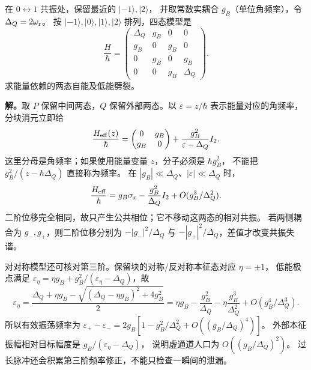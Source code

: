 \begin{exbox}[两侧虚通道的共同位移与差分位移]
在 $0\leftrightarrow1$ 共振处，保留最近的 $|-1\rangle,|2\rangle$，
并取常数实耦合 $g_B$（单位角频率），令 $\Delta_Q=2\omega_{\rm r}$。
按 $|-1\rangle,|0\rangle,|1\rangle,|2\rangle$ 排列，四态模型是
\[
\frac H\hbar=\begin{pmatrix}
\Delta_Q&g_B&0&0\\g_B&0&g_B&0\\
0&g_B&0&g_B\\0&0&g_B&\Delta_Q
\end{pmatrix}.
\]
求能量依赖的两态自能及低能劈裂。

\textbf{解。}取 $P$ 保留中间两态，$Q$ 保留外部两态。以 $\varepsilon=z/\hbar$ 表示能量对应的角频率，
分块消元立即给
\begin{equation}
\frac{H_{\rm eff}(z)}{\hbar}
=\begin{pmatrix}0&g_B\\g_B&0\end{pmatrix}
+\frac{g_B^2}{\varepsilon-\Delta_Q}I_2.
\label{eq:feqo-four-state-schur-effective}
\end{equation}
这里分母是角频率；如果使用能量变量 $z$，分子必须是 $\hbar g_B^2$，
不能把 $g_B^2/(z-\hbar\Delta_Q)$ 直接称为频率。
在 $|g_B|\ll\Delta_Q$、$|\varepsilon|\ll\Delta_Q$ 时，
\[
\frac{H_{\rm eff}}\hbar
=g_B\sigma_x-\frac{g_B^2}{\Delta_Q}I_2
+O(g_B^3/\Delta_Q^2).
\]
二阶位移完全相同，故只产生公共相位；它不移动这两态的相对共振。
若两侧耦合为 $g_-,g_+$，则二阶位移分别为
$-|g_-|^2/\Delta_Q$ 与 $-|g_+|^2/\Delta_Q$，差值才改变共振失谐。

对对称模型还可核对第三阶。保留块的对称/反对称本征态对应 $\eta=\pm1$，
低能极点满足 $\varepsilon_\eta=\eta g_B+g_B^2/(\varepsilon_\eta-\Delta_Q)$，故
\[
\varepsilon_\eta=\frac{\Delta_Q+\eta g_B-
\sqrt{(\Delta_Q-\eta g_B)^2+4g_B^2}}2
=\eta g_B-\frac{g_B^2}{\Delta_Q}
-\eta\frac{g_B^3}{\Delta_Q^2}+O(g_B^4/\Delta_Q^3).
\]
所以有效振荡频率为
$\varepsilon_+-\varepsilon_-=2g_B[1-g_B^2/\Delta_Q^2+O((g_B/\Delta_Q)^4)]$。
外部本征振幅相对目标幅度是 $g_B/(\varepsilon_\eta-\Delta_Q)$，
说明虚通道人口为 $O((g_B/\Delta_Q)^2)$。
过长脉冲还会积累第三阶频率修正，不能只检查一瞬间的泄漏。
\end{exbox}

